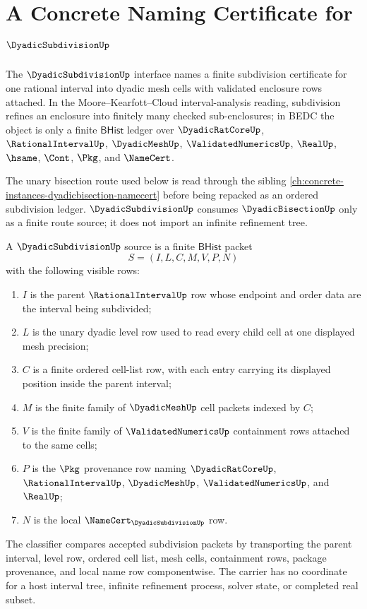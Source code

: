 \chapter{A Concrete Naming Certificate for $\DyadicSubdivisionUp$}
\label{ch:concrete-instances-dyadicsubdivision-namecert}

The $\DyadicSubdivisionUp$ interface names a finite subdivision certificate for one rational interval into dyadic mesh cells with validated enclosure rows attached. In the Moore--Kearfott--Cloud interval-analysis reading, subdivision refines an enclosure into finitely many checked sub-enclosures; in BEDC the object is only a finite $\mathsf{BHist}$ ledger over $\DyadicRatCoreUp$, $\RationalIntervalUp$, $\DyadicMeshUp$, $\ValidatedNumericsUp$, $\RealUp$, $\hsame$, $\Cont$, $\Pkg$, and $\NameCert$.

The unary bisection route used below is read through the sibling \autoref{ch:concrete-instances-dyadicbisection-namecert} before being repacked as an ordered subdivision ledger. $\DyadicSubdivisionUp$ consumes $\DyadicBisectionUp$ only as a finite route source; it does not import an infinite refinement tree.

\begin{definition}
\label{def:dyadic-subdivision-source}
A $\DyadicSubdivisionUp$ source is a finite $\mathsf{BHist}$ packet
$$
S=(I,L,C,M,V,P,N)
$$
with the following visible rows:
\begin{enumerate}
\item $I$ is the parent $\RationalIntervalUp$ row whose endpoint and order data are the interval being subdivided;
\item $L$ is the unary dyadic level row used to read every child cell at one displayed mesh precision;
\item $C$ is a finite ordered cell-list row, with each entry carrying its displayed position inside the parent interval;
\item $M$ is the finite family of $\DyadicMeshUp$ cell packets indexed by $C$;
\item $V$ is the finite family of $\ValidatedNumericsUp$ containment rows attached to the same cells;
\item $P$ is the $\Pkg$ provenance row naming $\DyadicRatCoreUp$, $\RationalIntervalUp$, $\DyadicMeshUp$, $\ValidatedNumericsUp$, and $\RealUp$;
\item $N$ is the local $\NameCert_{\DyadicSubdivisionUp}$ row.
\end{enumerate}
The classifier compares accepted subdivision packets by transporting the parent interval, level row, ordered cell list, mesh cells, containment rows, package provenance, and local name row componentwise. The carrier has no coordinate for a host interval tree, infinite refinement process, solver state, or completed real subset.
\end{definition}

